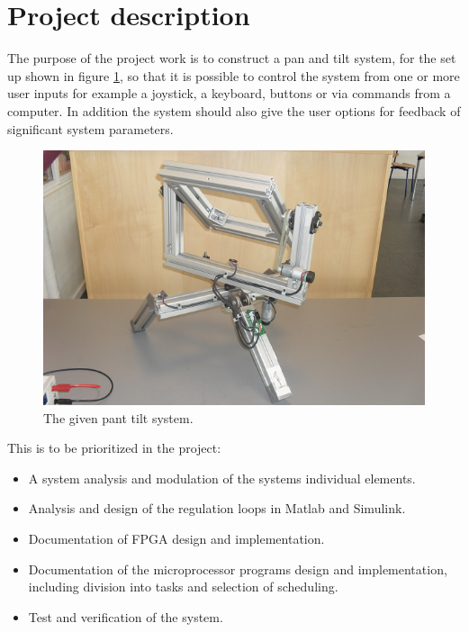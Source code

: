 
\section{Project description}
The purpose of the project work is to construct a pan and tilt system, for the set up shown in figure \ref{fig:pantilysystem}, so that it is possible to control the system from one or more user inputs for example a joystick, a keyboard, buttons or via commands from a computer. In addition the system should also give the user options for feedback of significant system parameters.

\begin{figure}[htb]
	\centering
	\includegraphics[scale=1,trim=0 0 0 0]{graphics/pantiltsystem.png} %
	\caption{The given pant tilt system.}
	\label{fig:pantilysystem}			%
\end{figure}

This is to be prioritized in the project:
\begin{itemize}
\item A system analysis and modulation of the systems individual elements.
\item Analysis and design of the regulation loops in Matlab and Simulink.
\item Documentation of FPGA design and implementation.
\item Documentation of the microprocessor programs design and implementation, including division into tasks and selection of scheduling.
\item Test and verification of the system.
\end{itemize}

